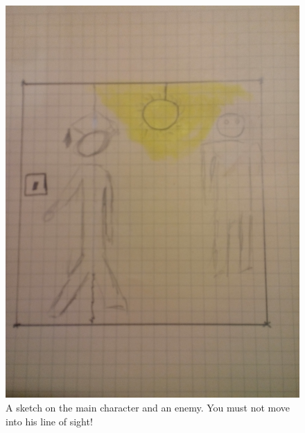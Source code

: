 \documentclass[12pt]{article}
\begin{document}
\begin{figure}[ht]
	\centering
	\includegraphics[width=1\linewidth]{Images/lighton}
	\caption{A sketch on the main character and an enemy. You must not move into his line of sight!}
\end{figure}
\end{document}
